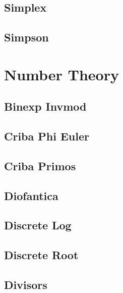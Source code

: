 \documentclass[10pt,landscape,twocolumn,a4paper,notitlepage]{article}
\newcommand\cppfile[2][]{

}
\begin{document}
\subsection{Simplex}
\cppfile{math/simplex.cpp}

\subsection{Simpson}
\cppfile{math/simpson.cpp}

\newpage


\section{Number Theory}

\subsection{Binexp Invmod}
\cppfile{number_theory/binexp_invmod.cpp}

\subsection{Criba Phi Euler}
\cppfile{number_theory/criba_phi_euler.cpp}

\subsection{Criba Primos}
\cppfile{number_theory/criba_primos.cpp}

\subsection{Diofantica}
\cppfile{number_theory/diofantica.cpp}

\subsection{Discrete Log}
\cppfile{number_theory/discrete_log.cpp}

\subsection{Discrete Root}
\cppfile{number_theory/discrete_root.cpp}

\subsection{Divisors}
\cppfile{number_theory/divisors.cpp}
\end{document}
